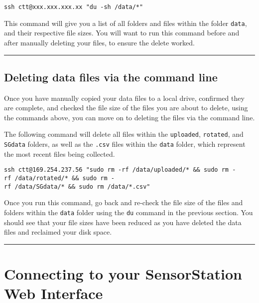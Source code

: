 \documentclass[
]{article}
\begin{document}
\texttt{ssh\ ctt@xxx.xxx.xxx.xx\ "du\ -sh\ /data/*"}

This command will give you a list of all folders and files within the
folder \texttt{data}, and their respective file sizes. You will want to
run this command before and after manually deleting your files, to
ensure the delete worked.

\begin{center}\rule{0.5\linewidth}{0.5pt}\end{center}

\hypertarget{deleting-data-files-via-the-command-line}{%
\subsection{Deleting data files via the command
line}\label{deleting-data-files-via-the-command-line}}

Once you have manually copied your data files to a local drive,
confirmed they are complete, and checked the file size of the files you
are about to delete, using the commands above, you can move on to
deleting the files via the command line.

The following command will delete all files within the
\texttt{uploaded}, \texttt{rotated}, and \texttt{SGdata} folders, as
well as the \texttt{.csv} files within the \texttt{data} folder, which
represent the most recent files being collected.

\texttt{ssh\ ctt@169.254.237.56\ "sudo\ rm\ -rf\ /data/uploaded/*\ \&\&\ sudo\ rm\ -rf\ /data/rotated/*\ \&\&\ sudo\ rm\ -rf\ /data/SGdata/*\ \&\&\ sudo\ rm\ /data/*.csv"}

Once you run this command, go back and re-check the file size of the
files and folders within the \texttt{data} folder using the \texttt{du}
command in the previous section. You should see that your file sizes
have been reduced as you have deleted the data files and reclaimed your
disk space.

\begin{center}\rule{0.5\linewidth}{0.5pt}\end{center}

\hypertarget{connecting-to-your-sensorstation-web-interface}{%
\section{Connecting to your SensorStation Web
Interface}\label{connecting-to-your-sensorstation-web-interface}}
\end{document}
